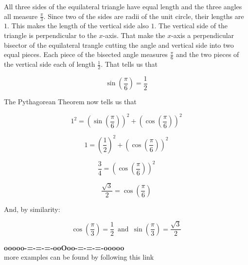 \documentclass{ximera}
\begin{document}
All three sides of the equilateral triangle have equal length and the three angles all measure $\frac{\pi}{3}$.  Since two of the sides are radii of the unit circle, their lengths are $1$.  This makes the length  of the vertical side also $1$.  The vertical side of the triangle is perpendicular to the $x$-axis.  That make the $x$-axis a perpendicular bisector of the equilateral trangle cutting the angle and vertical side into two equal pieces. Each piece of the bisected angle measures $\frac{\pi}{6}$ and the two pieces of the vertical side each of length $\frac{1}{2}$. That tells us that 

\[  \sin\left( \frac{\pi}{6} \right) = \frac{1}{2} \]


The Pythagorean Theorem now tells us that 

\[  1^2 = \left( \sin\left( \frac{\pi}{6} \right) \right)^2 + \left( \cos\left( \frac{\pi}{6} \right) \right)^2  \]


\[  1 = \left( \frac{1}{2} \right)^2 + \left( \cos\left( \frac{\pi}{6} \right) \right)^2  \]


\[  \frac{3}{4} = \left( \cos\left( \frac{\pi}{6} \right) \right)^2  \]



\[  \frac{\sqrt{3}}{2} = \cos\left( \frac{\pi}{6} \right)   \]



And, by similarity:


\[  \cos\left( \frac{\pi}{3} \right) = \frac{1}{2}   \, \text{ and } \,   \sin\left( \frac{\pi}{3} \right)  = \frac{\sqrt{3}}{2} \]  












\begin{center}
\textbf{\textcolor{green!50!black}{ooooo-=-=-=-ooOoo-=-=-=-ooooo}} \\

more examples can be found by following this link\\ 

\end{center}
\end{document}

